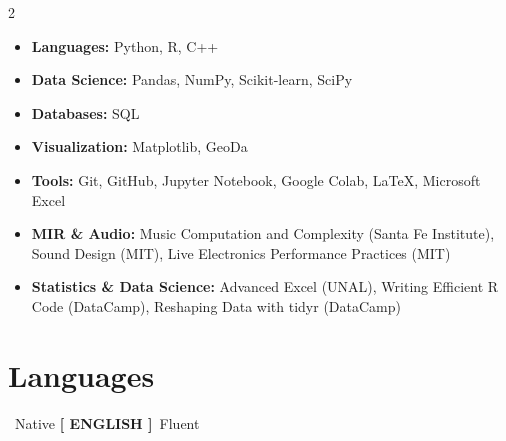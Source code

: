 \documentclass[9.5pt,letterpaper]{article}
\begin{document}
\begin{multicols}{2}

\begin{itemize}
    \item \textbf{Languages:} Python, R, C++
    \item \textbf{Data Science:} Pandas, NumPy, Scikit-learn, SciPy
    \item \textbf{Databases:} SQL
    \item \textbf{Visualization:} Matplotlib, GeoDa
    \item \textbf{Tools:} Git, GitHub, Jupyter Notebook, Google Colab, LaTeX, Microsoft Excel
\end{itemize}

\columnbreak

\noindent{\plexmono\bfseries\small\color{warpviolet}[ COURSES ]}
\begin{itemize}
    \item \textbf{MIR \& Audio:} Music Computation and Complexity (Santa Fe Institute), Sound Design (MIT), Live Electronics Performance Practices (MIT)
    \item \textbf{Statistics \& Data Science:} Advanced Excel (UNAL), Writing Efficient R Code (DataCamp), Reshaping Data with tidyr (DataCamp)
\end{itemize}

\end{multicols}

\vspace{2pt}

\section{Languages}

\noindent{\plexmono\bfseries\small\color{warpviolet}[ SPANISH ]}\ Native
\hspace{14pt}
{\plexmono\bfseries\small\color{warpviolet}[ ENGLISH ]}\ Fluent
\end{document}
